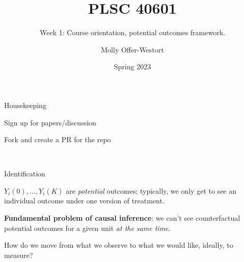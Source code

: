 \documentclass[xcolor={dvipsnames}, handout]{beamer}
\title{PLSC 40601}
\subtitle{Week 1: Course orientation, potential outcomes framework.}
\date{Spring 2023}
\author{Molly Offer-Westort}
\institute{Department of Political Science, \\University of Chicago}
\begin{document}


\frame{\titlepage
\thispagestyle{empty}
}
\begin{frame}{Housekeeping}

\pause
\begin{wideitemize}
\item Sign up for papers/discussion\pause
\item Fork and create a PR for the repo
\end{wideitemize}

\end{frame}



\begin{transitionframe}
\centering

\LARGE \textcolor{white}{Identification.}

\end{transitionframe}
\begin{frame}{Identification}

\begin{wideitemize}
\item $Y_i(0), \dots, Y_i(K)$ are \textit{potential} outcomes\pause; typically, we only get to see an individual outcome under one version of treatment. \pause
\item \textbf{Fundamental problem of causal inference}: we can't see counterfactual potential outcomes for a given unit \textit{at the same time}.\pause
\item How do we move from what we observe to what we would like, ideally, to measure? 
\end{wideitemize}

\end{frame}


\end{document}
